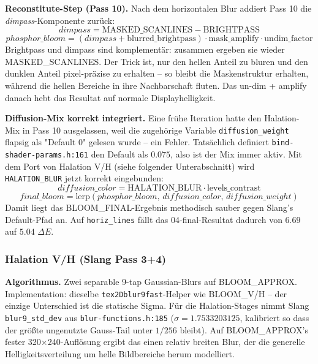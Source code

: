 \documentclass[11pt, a4paper]{article}
\begin{document}
\vspace{.5cm}
\textbf{Reconstitute-Step (Pass 10).} Nach dem horizontalen Blur addiert Pass 10 die \emph{dimpass}-Komponente zur\"uck:
\[
    \mathit{dimpass} = \mathrm{MASKED\_SCANLINES} - \mathrm{BRIGHTPASS}
\]
\[
    \mathit{phosphor\_bloom} = (\mathit{dimpass} + \mathrm{blurred\_brightpass}) \cdot \mathrm{mask\_amplify} \cdot \mathrm{undim\_factor}
\]
Brightpass und dimpass sind komplement\"ar: zusammen ergeben sie wieder MASKED\_SCANLINES. Der Trick ist, nur den hellen Anteil zu bluren und den dunklen Anteil pixel-pr\"azise zu erhalten -- so bleibt die Maskenstruktur erhalten, w\"ahrend die hellen Bereiche in ihre Nachbarschaft fluten. Das un-dim + amplify danach hebt das Resultat auf normale Displayhelligkeit.

\vspace{.5cm}
\textbf{Diffusion-Mix korrekt integriert.} Eine fr\"uhe Iteration hatte den Halation-Mix in Pass 10 ausgelassen, weil die zugeh\"orige Variable \texttt{diffusion\_weight} flapsig als "Default 0" gelesen wurde -- ein Fehler. Tats\"achlich definiert \texttt{bind-shader-params.h:161} den Default als $0.075$, also ist der Mix immer aktiv. Mit dem Port von Halation V/H (siehe folgender Unterabschnitt) wird \texttt{HALATION\_BLUR} jetzt korrekt eingebunden:
\[
    \mathit{diffusion\_color} = \mathrm{HALATION\_BLUR} \cdot \mathrm{levels\_contrast}
\]
\[
    \mathit{final\_bloom} = \mathrm{lerp}(\mathit{phosphor\_bloom},\, \mathit{diffusion\_color},\, \mathit{diffusion\_weight})
\]
Damit liegt das BLOOM\_FINAL-Ergebnis methodisch sauber gegen Slang's Default-Pfad an. Auf \texttt{horiz\_lines} f\"allt das 04-final-Resultat dadurch von $6.69$ auf $5.04$ $\Delta E$.

\vspace{.5cm}
\subsubsection*{Halation V/H (Slang Pass 3+4)}
\textbf{Algorithmus.} Zwei separable 9-tap Gaussian-Blurs auf BLOOM\_APPROX. Implementation: dieselbe \texttt{tex2Dblur9fast}-Helper wie BLOOM\_V/H -- der einzige Unterschied ist die statische Sigma. F\"ur die Halation-Stages nimmt Slang \texttt{blur9\_std\_dev} aus \texttt{blur-functions.h:185} ($\sigma = 1.7533203125$, kalibriert so dass der gr\"o{\ss}te ungenutzte Gauss-Tail unter $1/256$ bleibt). Auf BLOOM\_APPROX's fester 320$\times$240-Aufl\"osung ergibt das einen relativ breiten Blur, der die generelle Helligkeitsverteilung um helle Bildbereiche herum modelliert.
\end{document}

